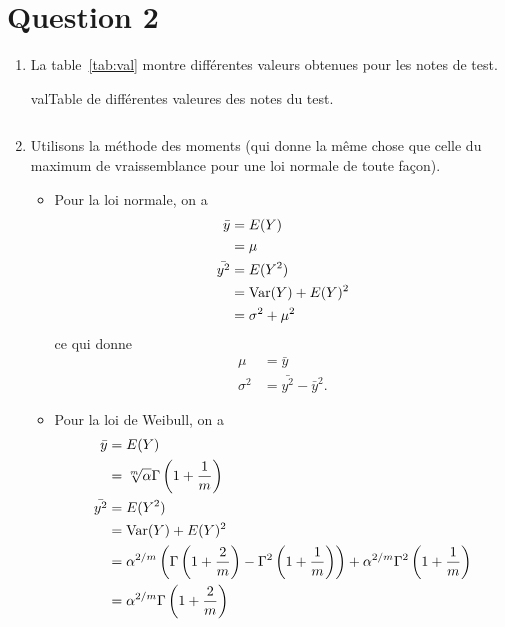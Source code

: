 \section{Question 2}
\begin{enumerate}
  \item La table~\ref{tab:val} montre différentes valeurs obtenues pour les notes de test.
    \begin{mytable}{val}{Table de différentes valeures des notes du test.}
      \begin{tabular}{ll}
        
      \end{tabular}
    \end{mytable}
  \item Utilisons la méthode des moments
    (qui donne la même chose que celle du maximum de vraissemblance pour
    une loi normale de toute façon).
    \begin{itemize}
      \item
        Pour la loi normale, on a
        \begin{align*}
          \bar{y} & = E(Y)\\
                  & = \mu\\
          \bar{y^2} & = E(Y^2)\\
                    & = \operatorname{Var}(Y) + E(Y)^2\\
                    & = \sigma^2 + \mu^2
        \end{align*}
        ce qui donne
        \begin{align*}
          \mu & = \bar{y}\\
          \sigma^2 & = \bar{y^2} - \bar{y}^2.
        \end{align*}
      \item
        Pour la loi de Weibull, on a
        \begin{align*}
          \bar{y} & = E(Y)\\
                  & = \sqrt[m]{\alpha}\Gamma\left(1 + \frac{1}{m}\right)\\
          \bar{y^2} & = E(Y^2)\\
                    & = \operatorname{Var}(Y) + E(Y)^2\\
                    & = \alpha^{2/m}\left(\Gamma\left(1 + \frac{2}{m}\right) -
                    \Gamma^2\left(1 + \frac{1}{m}\right)\right) + \alpha^{2/m}\Gamma^2\left(1 + \frac{1}{m}\right)\\
                    & = \alpha^{2/m}\Gamma\left(1 + \frac{2}{m}\right)
        \end{align*}

\end{itemize}
\end{enumerate}
